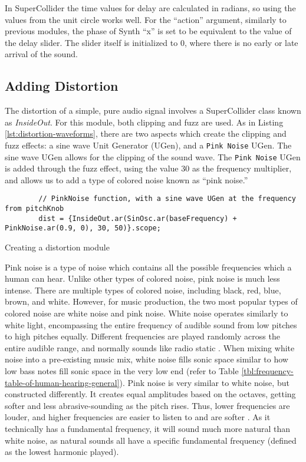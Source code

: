 In SuperCollider the time values for delay are calculated in radians, so using the values from the unit circle works well. For the ``action'' argument, similarly to previous modules, the phase of Synth ``x'' is set to be equivalent to the value of the delay slider. The slider itself is initialized to 0, where there is no early or late arrival of the sound.

\subsection{Adding Distortion}

The distortion of a simple, pure audio signal involves a SuperCollider class known as \textit{InsideOut}. For this module, both clipping and fuzz are used. As in Listing \ref{lst:distortion-waveforms}, there are two aspects which create the clipping and fuzz effects: a sine wave Unit Generator (UGen), and a \texttt{Pink Noise} UGen. The sine wave UGen allows for the clipping of the sound wave. The \texttt{Pink Noise} UGen is added through the fuzz effect, using the value 30 as the frequency multiplier, and allows us to add a type of colored noise known as ``pink noise.''

\begin{listing}
	\begin{lstlisting}
		// PinkNoise function, with a sine wave UGen at the frequency from pitchKnob
		dist = {InsideOut.ar(SinOsc.ar(baseFrequency) + PinkNoise.ar(0.9, 0), 30, 50)}.scope;
	\end{lstlisting}
	\caption{Creating a distortion module}
	\label{lst:distortion-waveforms}
\end{listing}

Pink noise is a type of noise which contains all the possible frequencies which a human can hear. Unlike other types of colored noise, pink noise is much less intense. There are multiple types of colored noise, including black, red, blue, brown, and white. However, for music production, the two most popular types of colored noise are white noise and pink noise. White noise operates similarly to white light, encompassing the entire frequency of audible sound from low pitches to high pitches equally. Different frequencies are played randomly across the entire audible range, and normally sounds like radio static \cite{Unison_2021}. When mixing white noise into a pre-existing music mix, white noise fills sonic space similar to how low bass notes fill sonic space in the very low end (refer to Table \ref{tbl:frequency-table-of-human-hearing-general}). Pink noise is very similar to white noise, but constructed differently. It creates equal amplitudes based on the octaves, getting softer and less abrasive-sounding as the pitch rises. Thus, lower frequencies are louder, and higher frequencies are easier to listen to and are softer \cite{Unison_2021}. As it technically has a fundamental frequency, it will sound much more natural than white noise, as natural sounds all have a specific fundamental frequency (defined as the lowest harmonic played).

